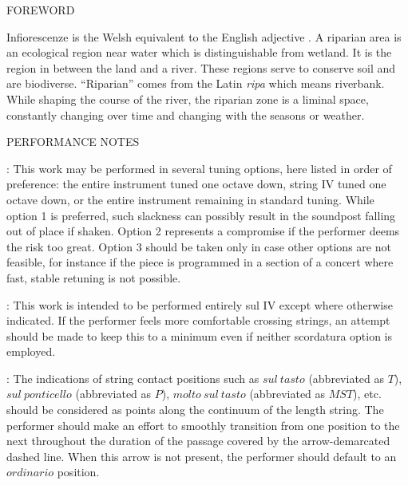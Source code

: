 \documentclass[11pt]{article}
\newcommand*\circled[1]{\tikz[baseline=(char.base)]{
            \node[shape=circle,draw,inner sep=1pt] (char) {#1};}}
\begin{document}
\begin{center}
\huge FOREWORD
\end{center}

\begingroup

\begin{center}
Infiorescenze is the Welsh equivalent to the English adjective . A riparian area is an ecological region near water which is distinguishable from wetland. It is the region in between the land and a river. These regions serve to conserve soil and are biodiverse. ``Riparian'' comes from the Latin \textit{ripa} which means riverbank. While shaping the course of the river, the riparian zone is a liminal space, constantly changing over time and changing with the seasons or weather.
\rightskip\leftskip
\phantom{text} \hfill \phantom{()}
\end{center}

\endgroup

\vspace*{1\baselineskip}

\begin{center}
\huge PERFORMANCE NOTES
\end{center}

 : This work may be performed in several tuning options, here listed in order of preference: \circled{1} the entire instrument tuned one octave down, \circled{2} string IV tuned one octave down, or \circled{3} the entire instrument remaining in standard tuning. While option 1 is preferred, such slackness can possibly result in the soundpost falling out of place if shaken. Option 2 represents a compromise if the performer deems the risk too great. Option 3 should be taken only in case other options are not feasible, for instance if the piece is programmed in a section of a concert where fast, stable retuning is not possible.
\rightskip\leftskip
\phantom{text} \hfill \phantom{()}

 : This work is intended to be performed entirely sul IV except where otherwise indicated. If the performer feels more comfortable crossing strings, an attempt should be made to keep this to a minimum even if neither scordatura option is employed.
\rightskip\leftskip
\phantom{text} \hfill \phantom{()}

 : The indications of string contact positions such as $sul \ tasto$ (abbreviated as $T$), $sul \ ponticello$ (abbreviated as $P$), $molto \ sul \ tasto$ (abbreviated as $MST$), etc. should be considered as points along the continuum of the length string. The performer should make an effort to smoothly transition from one position to the next throughout the duration of the passage covered by the arrow-demarcated dashed line. When this arrow is not present, the performer should default to an $ordinario$ position.
\rightskip\leftskip
\phantom{text} \hfill \phantom{()}
\end{document}
